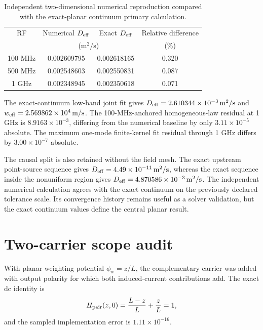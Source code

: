 \documentclass[aps,pra,onecolumn,superscriptaddress,nofootinbib]{revtex4-2}
\begin{document}
\begin{table}[h]
\caption{Independent two-dimensional numerical reproduction compared with the exact-planar continuum primary calculation.}
\centering
\begin{tabular}{cccc}
\toprule
RF & Numerical $D_{\rm eff}$ & Exact $D_{\rm eff}$ & Relative difference\\
 & \multicolumn{2}{c}{($\mathrm{m^2/s}$)} & (\%)\\
\midrule
100 MHz & 0.002609795 & 0.002618165 & 0.320\\
500 MHz & 0.002548603 & 0.002550831 & 0.087\\
1 GHz   & 0.002348945 & 0.002350618 & 0.071\\
\bottomrule
\end{tabular}
\end{table}

The exact-continuum low-band joint fit gives $D_{\rm eff}=2.610344\times10^{-3}\,\mathrm{m^2/s}$ and $w_{\rm eff}=2.569862\times10^4\,\mathrm{m/s}$.  The 100-MHz-anchored homogeneous-law residual at 1 GHz is $8.9163\times10^{-3}$, differing from the numerical baseline by only $3.11\times10^{-5}$ absolute.  The maximum one-mode finite-kernel fit residual through 1 GHz differs by $3.00\times10^{-7}$ absolute.

The causal split is also retained without the field mesh.  The exact upstream point-source sequence gives $D_{\rm eff}=4.49\times10^{-11}\,\mathrm{m^2/s}$, whereas the exact sequence inside the nonuniform region gives $D_{\rm eff}=4.870586\times10^{-3}\,\mathrm{m^2/s}$.  The independent numerical calculation agrees with the exact continuum on the previously declared tolerance scale. Its convergence history remains useful as a solver validation, but the exact continuum values define the central planar result.


\section{Two-carrier scope audit}

With planar weighting potential $\phi_w=z/L$, the complementary carrier was added with output polarity for which both induced-current contributions add. The exact dc identity is
\begin{equation}
H_{\rm pair}(z,0)=\frac{L-z}{L}+\frac{z}{L}=1,
\end{equation}
and the sampled implementation error is $1.11\times10^{-16}$.
\end{document}
